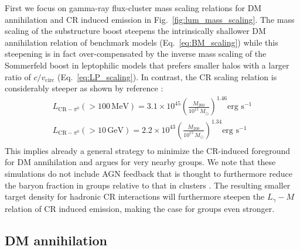 \documentclass[10pt,aps,pra,reprint,amsmath,amsfonts,amssymb,showpacs,nofootinbib,floatfix]{revtex4-1}
\newcommand{\rmn}{\mathrm}
\newcommand{\msun}{M_\odot}
\newcommand{\mev}{\rmn{MeV}}
\newcommand{\gev}{\rmn{GeV}}
\newcommand{\mvir}{M_{200}}
\begin{document}
First we focus on gamma-ray flux-cluster mass scaling relations for DM
annihilation and CR induced emission in Fig.~\ref{fig:lum_mass_scaling}.  The
mass scaling of the substructure boost steepens the intrinsically shallower DM
annihilation relation of benchmark models (Eq.~\ref{eq:BM_scaling}) while
this steepening is in fact over-compensated by the inverse mass scaling of the
Sommerfeld boost in leptophilic models that prefers smaller halos with a larger
ratio of $c/v_\mathrm{circ}$ (Eq.~\ref{eq:LP_scaling}). In contrast, the
CR scaling relation is considerably steeper as shown by reference
\cite{2010MNRAS.409..449P}: 
\begin{eqnarray}
L_{\rmn{CR}-\ensuremath{\pi^0}}(>100\,\mev) = 3.1\times10^{45}
\left(\frac{\mvir}{10^{15}\,\msun}\right)^{1.46}\mbox{erg~s}^{-1}\nonumber\\
L_{\rmn{CR}-\ensuremath{\pi^0}}(>10\,\gev)  = 2.2\times10^{43}
\left(\frac{\mvir}{10^{15}\,\msun}\right)^{1.34}\mbox{erg~s}^{-1}\nonumber\\
\end{eqnarray}
This implies already a general strategy to minimize the CR-induced
foreground for DM annihilation and argues for very nearby groups. We
note that these simulations do not include AGN feedback that is
thought to furthermore reduce the baryon fraction in groups relative
to that in clusters \cite{2008ApJ...687L..53P}. The resulting smaller
target density for hadronic CR interactions will furthermore steepen
the $L_\gamma-M$ relation of CR induced emission, making the case for
groups even stronger.

\subsection{DM annihilation}
\end{document}
